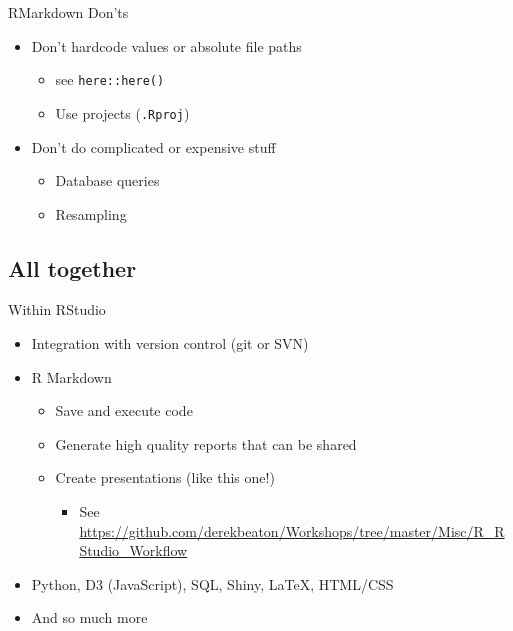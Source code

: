 \documentclass[
  ignorenonframetext,
]{beamer}
\providecommand{\tightlist}{%
  \setlength{\itemsep}{0pt}\setlength{\parskip}{0pt}}
\begin{document}
\begin{frame}[fragile]{RMarkdown Don'ts}
\protect\hypertarget{rmarkdown-donts}{}

\begin{itemize}[<+->]
\tightlist
\item
  Don't hardcode values or absolute file paths

  \begin{itemize}[<+->]
  \tightlist
  \item
    see \texttt{here::here()}
  \item
    Use projects (\texttt{.Rproj})
  \end{itemize}
\item
  Don't do complicated or expensive stuff

  \begin{itemize}[<+->]
  \tightlist
  \item
    Database queries
  \item
    Resampling
  \end{itemize}
\end{itemize}

\end{frame}

\hypertarget{all-together}{%
\subsection{All together}\label{all-together}}

\begin{frame}{Within RStudio}
\protect\hypertarget{within-rstudio}{}

\begin{itemize}[<+->]
\tightlist
\item
  Integration with version control (git or SVN)
\item
  R Markdown

  \begin{itemize}[<+->]
  \tightlist
  \item
    Save and execute code
  \item
    Generate high quality reports that can be shared
  \item
    Create presentations (like this one!)

    \begin{itemize}[<+->]
    \tightlist
    \item
      See
      \url{https://github.com/derekbeaton/Workshops/tree/master/Misc/R_RStudio_Workflow}
    \end{itemize}
  \end{itemize}
\item
  Python, D3 (JavaScript), SQL, Shiny, LaTeX, HTML/CSS
\item
  And so much more
\end{itemize}

\end{frame}
\end{document}

